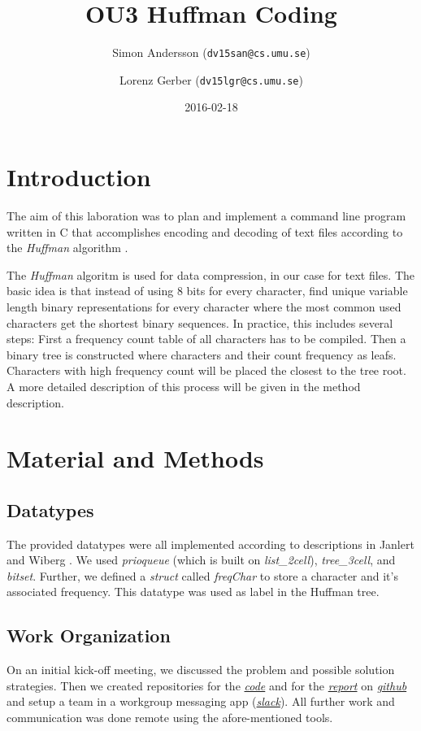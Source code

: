 \documentclass[a4paper,11pt,twoside]{article}
\title{OU3 Huffman Coding}
\author{Simon Andersson ({\tt{dv15san@cs.umu.se}})}
\author{Lorenz Gerber ({\tt{dv15lgr@cs.umu.se}})}
\date{2016-02-18}
\begin{document}
\lstset{language=C}
\maketitle
\thispagestyle{empty}

\tableofcontents
\newpage

\clearpage
{} 

\section{Introduction} 
The aim of this laboration was to plan and implement a command line
program written in C that accomplishes encoding and decoding of 
text files according to the \emph{Huffman} algorithm \cite{huffman1952}.

The \emph{Huffman} algoritm is used for data compression, in our case
for text files. The basic idea is that instead of using 8 bits for
every character, find unique variable length binary representations
for every character where the most common used characters get the
shortest binary sequences. In practice, this includes several steps:
First a frequency count table of all characters has to be
compiled. Then a binary tree is constructed where characters and their
count frequency as leafs. Characters with high frequency count will be
placed the closest to the tree root. A more detailed description of
this process will be given in the method description.



\section{Material and Methods}
\subsection{Datatypes}
The provided datatypes were all implemented according to descriptions
in Janlert and Wiberg \cite{janlert2000}. We used \emph{prioqueue}
(which is built on \emph{list\_2cell}), \emph{tree\_3cell}, and
\emph{bitset}. Further, we defined a \emph{struct} called
\emph{freqChar} to store a character and it's associated frequency. 
This datatype was used as label in the Huffman tree.


\subsection{Work Organization}
On an initial kick-off meeting, we discussed the problem and possible
solution strategies. Then we created repositories for the 
\emph{\href{https://github.com/lorenzgerber/huffman}{code}} and for
the \emph{\href{https://github.com/lorenzgerber/report_huffman}{report}}
on \emph{\href{https://github.com}{github}} and setup a team in a 
workgroup messaging  app (\emph{\href{https://slack.com}{slack}}). All
further work and communication was done remote using the
afore-mentioned tools. 
\end{document}
